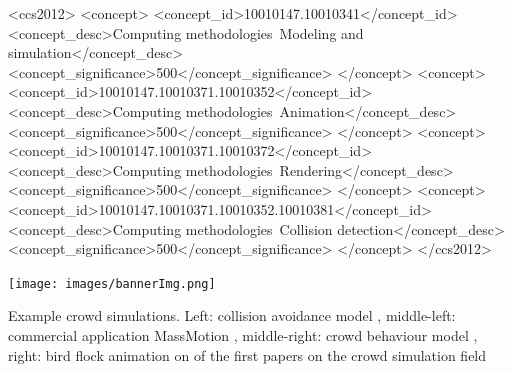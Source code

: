 \documentclass[sigconf]{acmart}
\begin{document}
\begin{CCSXML}
<ccs2012>
<concept>
<concept_id>10010147.10010341</concept_id>
<concept_desc>Computing methodologies~Modeling and simulation</concept_desc>
<concept_significance>500</concept_significance>
</concept>
<concept>
<concept_id>10010147.10010371.10010352</concept_id>
<concept_desc>Computing methodologies~Animation</concept_desc>
<concept_significance>500</concept_significance>
</concept>
<concept>
<concept_id>10010147.10010371.10010372</concept_id>
<concept_desc>Computing methodologies~Rendering</concept_desc>
<concept_significance>500</concept_significance>
</concept>
<concept>
<concept_id>10010147.10010371.10010352.10010381</concept_id>
<concept_desc>Computing methodologies~Collision detection</concept_desc>
<concept_significance>500</concept_significance>
</concept>
</ccs2012>
\end{CCSXML}


\begin{teaserfigure}
  \texttt{[image: images/bannerImg.png]}
  \caption{Example crowd simulations. Left: collision avoidance model \cite{ondrej_synthetic-vision_2010}, middle-left: commercial application MassMotion \cite{mediaworks_pedestrian_2020}, middle-right: crowd behaviour model \cite{pelechano_controlling_2007}, right: bird flock animation on of the first papers on the crowd simulation field \cite{reynolds_flocks_1987}}
  \label{fig:teaser}
\end{teaserfigure}

\maketitle
\end{document}
